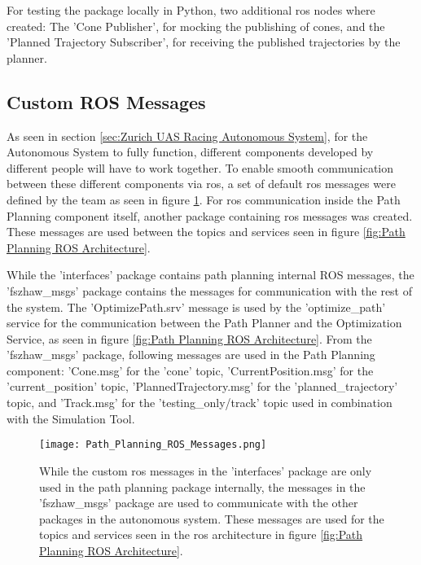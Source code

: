 For testing the package locally in Python, two additional \acrshort{ros} nodes where created: The 'Cone Publisher', for mocking the publishing of cones, and the 'Planned Trajectory Subscriber', for receiving the published trajectories by the planner.

\subsection{Custom ROS Messages} \label{sec:Custom ROS Messages}
As seen in section \ref{sec:Zurich UAS Racing Autonomous System}, for the Autonomous System to fully function, different components developed by different people will have to work together. To enable smooth communication between these different components via \acrshort{ros}, a set of default \acrshort{ros} messages were defined by the team as seen in figure \ref{fig:Path Planning ROS Messages}. For \acrshort{ros} communication inside the Path Planning component itself, another package containing \acrshort{ros} messages was created. These messages are used between the topics and services seen in figure \ref{fig:Path Planning ROS Architecture}.

While the 'interfaces' package contains path planning internal ROS messages, the 'fszhaw\_msgs' package contains the messages for communication with the rest of the system. The 'OptimizePath.srv' message is used by the 'optimize\_path' service for the communication between the Path Planner and the Optimization Service, as seen in figure \ref{fig:Path Planning ROS Architecture}. From the 'fszhaw\_msgs' package, following messages are used in the Path Planning component: 'Cone.msg' for the 'cone' topic, 'CurrentPosition.msg' for the 'current\_position' topic, 'PlannedTrajectory.msg' for the 'planned\_trajectory' topic, and 'Track.msg' for the 'testing\_only/track' topic used in combination with the Simulation Tool.

\begin{figure}[H]
    \centering
    \texttt{[image: Path\_Planning\_ROS\_Messages.png]}
    \caption{While the custom \acrshort{ros} messages in the 'interfaces' package are only used in the path planning package internally, the messages in the 'fszhaw\_msgs' package are used to communicate with the other packages in the autonomous system. These messages are used for the topics and services seen in the \acrshort{ros} architecture in figure \ref{fig:Path Planning ROS Architecture}.}
    \label{fig:Path Planning ROS Messages}
\end{figure}

